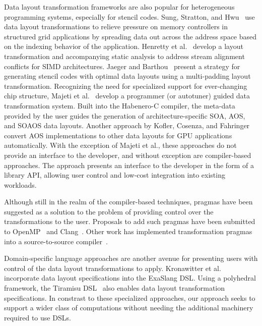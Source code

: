 Data layout transformation frameworks are also popular for heterogeneous programming systems, especially for stencil codes.
Sung, Stratton, and Hwu~\cite{sung2010data} use data layout transformations to relieve pressure on memory controllers in structured grid applications by spreading data out across the address space based on the indexing behavior of the application.
Henretty et al.~\cite{henretty2011data} develop a layout transformation and accompanying static analysis to address stream alignment conflicts for SIMD architectures.
Jaeger and Barthou~\cite{jaeger2012automatic} present a strategy for generating stencil codes with optimal data layouts using a multi-padding layout transformation.
Recognizing the need for specialized support for ever-changing chip structure, Majeti et al.~\cite{majeti2013compiler} develop a programmer (or autotuner) guided data transformation system.
Built into the Habenero-C compiler, the meta-data provided by the user guides the generation of architecture-specific SOA, AOS, and SOAOS data layouts.
Another approach by Kofler, Cosenza, and Fahringer~\cite{kofler2015automatic} convert AOS implementations to other data layouts for GPU applications automatically.  
With the exception of Majeti et al., these approaches do not provide an interface to the developer, and without exception are compiler-based approaches.
The \FormatDecisions{} approach presents an interface to the developer in the form of a library API, allowing user control and low-cost integration into existing workloads.

Although still in the realm of the compiler-based techniques, pragmas have been suggested as a solution to the problem of providing control over the transformations to the user.
Proposals to add such pragmas have been submitted to OpenMP~\cite{kruse2019design} and Clang~\cite{kruse2018user}.
Other work has implemented transformation pragmas into a source-to-source compiler~\cite{xu2014semi}. 


Domain-specific language approaches are another avenue for presenting users with control of the data layout transformations to apply. 
Kronawitter et al.~\cite{kronawitter2018automatic} incorporate data layout specifications into the ExaSlang DSL.
Using a polyhedral framework, the Tiramisu DSL~\cite{baghdadi2019tiramisu} also enables data layout transformation specifications.
In constrast to these specialized approaches, our approach seeks to support a wider class of computations without needing the additional machinery required to use DSLs. 


